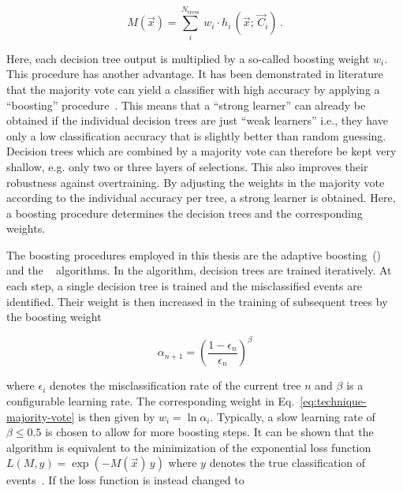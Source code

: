 \begin{equation}
M(\vec{x})=\sum_{i}^{N_\mathrm{trees}}~w_{i}\cdot h_{i}\,(\vec{x};\,\vec{C}_{i})\,.\label{eq:technique-majority-vote}
\end{equation}

Here, each decision tree output is multiplied by a so-called boosting weight $w_{i}$. This procedure has another advantage. It has been demonstrated in literature that the majority vote can yield a classifier with high accuracy by applying a ``boosting'' procedure~\cite{Schapire1990,FREUND1995256}. This means that a ``strong learner'' can already be obtained if the individual decision trees are just ``weak learners'' i.e., they have only a low classification accuracy that is slightly better than random guessing. Decision trees which are combined by a majority vote can therefore be kept very shallow, e.g. only two or three layers of selections. This also improves their robustness against overtraining. By adjusting the weights in the majority vote according to the individual accuracy per tree, a strong learner is obtained. Here, a boosting procedure determines the decision trees and the corresponding weights.


The boosting procedures employed in this thesis are the adaptive boosting~(\ADABOOST[])~\cite{FREUND1997119} and the \GRADIENTBOOST[]~\cite{Friedman00greedyfunction} algorithms. In the \ADABOOST algorithm, decision trees are trained iteratively. At each step, a single decision tree is trained and the misclassified events are identified. Their weight is then increased in the training of subsequent trees by the boosting weight

\begin{equation}
\alpha_{n+1}=\left(\frac{1-\epsilon_{n}}{\epsilon_{n}}\right)^\beta
\end{equation}

where $\epsilon_{i}$ denotes the misclassification rate of the current tree $n$ and $\beta$ is a configurable learning rate. The corresponding weight in Eq.~\ref{eq:technique-majority-vote} is then given by $w_{i}=\ln\alpha_{i}$. Typically, a slow learning rate of $\beta\leq0.5$ is chosen to allow for more boosting steps. It can be shown that the \ADABOOST algorithm is equivalent to the minimization of the exponential loss function $L(M,y)=\exp(-M(\vec{x})\,y)$ where $y$ denotes the true classification of events~\cite{Hocker:2007ht}. If the loss function is instead changed to 

